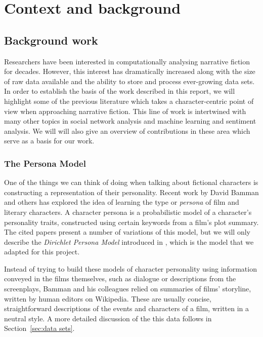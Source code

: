 \documentclass[bsc,frontabs,singlespacing,parskip, twoside]{infthesis}
\begin{document}
\chapter{Context and background}
\label{chap:background}

\section{Background work}
Researchers have been interested in computationally analysing narrative fiction for decades. However, this interest has dramatically increased along with the size of raw data available and the ability to store and process ever-growing data sets. In order to establish the basis of the work described in this report, we will highlight some of the previous literature which takes a character-centric point of view when approaching narrative fiction. This line of work is intertwined with many other topics in social network analysis and machine learning and sentiment analysis. We will will also give an overview of contributions in these area which serve as a basis for our work.

\subsection{The Persona Model}
\label{sec:bg_persona}
One of the things we can think of doing when talking about fictional characters is constructing a representation of their personality. Recent work by David Bamman and others has explored the idea of learning the type or \textit{persona} of film \cite{Bamman2013} and literary \cite{Bamman2014} characters. A character persona is a probabilistic model of a character's personality traits, constructed using certain keywords from a film's plot summary. The cited papers present a number of variations of this model, but we will only describe the \textit{Dirichlet Persona Model} introduced in \cite{Bamman2013}, which is the model that we adapted for this project.

Instead of trying to build these models of character personality using information conveyed in the films themselves, such as dialogue or descriptions from the screenplays, Bamman and his colleagues relied on summaries of films' storyline, written by human editors on Wikipedia. These are usually concise, straightforward descriptions of the events and characters of a film, written in a neutral style. A more detailed discussion of the this data follows in Section~\ref{sec:data sets}. 
\end{document}
